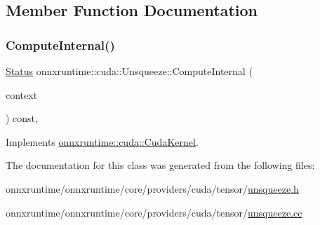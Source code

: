 \subsection{Member Function Documentation}
\mbox{\label{classonnxruntime_1_1cuda_1_1Unsqueeze_acb3d90ba25a9dbc3c4feb1af6ec4664a}} 
\subsubsection{\texorpdfstring{Compute\+Internal()}{ComputeInternal()}}
{\footnotesize\ttfamily \mbox{\hyperlink{classonnxruntime_1_1common_1_1Status}{Status}} onnxruntime\+::cuda\+::\+Unsqueeze\+::\+Compute\+Internal (\begin{DoxyParamCaption}\item[{\mbox{\hyperlink{classonnxruntime_1_1OpKernelContext}{Op\+Kernel\+Context}} $\ast$}]{context }\end{DoxyParamCaption}) const\hspace{0.3cm}{\ttfamily [override]}, {\ttfamily [virtual]}}



Implements \mbox{\hyperlink{classonnxruntime_1_1cuda_1_1CudaKernel_aca7af04ae448017d6023d30bba231ebb}{onnxruntime\+::cuda\+::\+Cuda\+Kernel}}.



The documentation for this class was generated from the following files\+:\begin{DoxyCompactItemize}
\item 
onnxruntime/onnxruntime/core/providers/cuda/tensor/\mbox{\hyperlink{cuda_2tensor_2unsqueeze_8h}{unsqueeze.\+h}}\item 
onnxruntime/onnxruntime/core/providers/cuda/tensor/\mbox{\hyperlink{cuda_2tensor_2unsqueeze_8cc}{unsqueeze.\+cc}}\end{DoxyCompactItemize}
